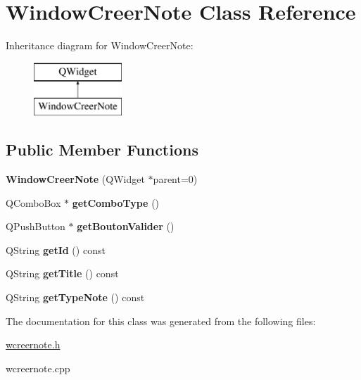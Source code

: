 \hypertarget{class_window_creer_note}{}\section{Window\+Creer\+Note Class Reference}
\label{class_window_creer_note}
Inheritance diagram for Window\+Creer\+Note\+:\begin{figure}[H]
\begin{center}
\leavevmode
\includegraphics[height=2.000000cm]{class_window_creer_note}
\end{center}
\end{figure}
\subsection*{Public Member Functions}
\begin{DoxyCompactItemize}
\item 
\mbox{\label{class_window_creer_note_a1b9d13c3818e450e1d3dffc5707658f4}} 
{\bfseries Window\+Creer\+Note} (Q\+Widget $\ast$parent=0)
\item 
\mbox{\label{class_window_creer_note_a036ba88629b9e826fbec74655839a596}} 
Q\+Combo\+Box $\ast$ {\bfseries get\+Combo\+Type} ()
\item 
\mbox{\label{class_window_creer_note_a109db3e13f21dc3ddb1038287fda60a3}} 
Q\+Push\+Button $\ast$ {\bfseries get\+Bouton\+Valider} ()
\item 
\mbox{\label{class_window_creer_note_aecc75344edf4436802f406f13a47bba7}} 
Q\+String {\bfseries get\+Id} () const
\item 
\mbox{\label{class_window_creer_note_ad76caab1cd6962d93c855bbb4da6ebf0}} 
Q\+String {\bfseries get\+Title} () const
\item 
\mbox{\label{class_window_creer_note_ade4db2abe278a39b26cd66cc4530ddec}} 
Q\+String {\bfseries get\+Type\+Note} () const
\end{DoxyCompactItemize}


The documentation for this class was generated from the following files\+:\begin{DoxyCompactItemize}
\item 
\hyperlink{wcreernote_8h}{wcreernote.\+h}\item 
wcreernote.\+cpp\end{DoxyCompactItemize}
